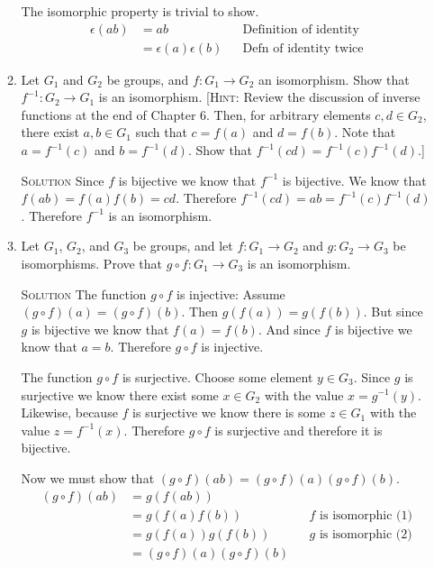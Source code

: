 \documentclass[twoside]{amsart}
\newcommand{\solution}{\textsc{Solution}\xspace}
\newcommand{\blank}{\vspace{5pt}}
\newcommand{\ind}{\hspace{.35in}}
\begin{document}
\begin{enumerate}[A.]
\begin{enumerate}[1]
	The isomorphic property is trivial to show. 
	\begin{align*}
	    \epsilon(ab) &= ab && \text{Definition of identity} \\
		              &= \epsilon(a)\epsilon(b) && \text{Defn of identity twice}
	\end{align*}

	\item Let $G_1$ and $G_2$ be groups, and $f: G_1 \to G_2$ an isomorphism.
	Show that $f^{-1} : G_2 \to G_1$ is an isomorphism. [\textsc{Hint}:
	Review the discussion of inverse functions at the end of Chapter 6. Then,
	for arbitrary elements $c, d \in G_2$, there exist $a, b \in G_1$ such
	that $c = f(a)$ and $d = f(b)$. Note that $a = f^{-1}(c)$ and 
	$b = f^{-1}(d)$. Show that $f^{-1}(cd)=f^{-1}(c)f^{-1}(d)$.]

   \blank \noindent \solution Since $f$ is bijective we know that
	$f^{-1}$ is bijective. We know that $f(ab)=f(a)f(b)=cd$. Therefore
	$f^{-1}(cd)=ab=f^{-1}(c)f^{-1}(d)$. Therefore $f^{-1}$ is an isomorphism.

	\item Let $G_1$, $G_2$, and $G_3$ be groups, and let $f: G_1 \to G_2$ and
	$g:G_2 \to G_3$ be isomorphisms. Prove that $g \circ f : G_1 \to G_3$ is
	an isomorphism.

	\blank \noindent \solution The function $g \circ f$ is injective:
	Assume $(g \circ f)(a) = (g \circ f)(b)$. Then $g(f(a)) = g(f(b))$. But
	since $g$ is bijective we know that $f(a)=f(b)$. And since $f$ is
	bijective we know that $a=b$. Therefore $g \circ f$ is injective.

	\ind The function $g \circ f$ is surjective. Choose some element $y \in G_3$.
	Since $g$ is surjective we know there exist some $x \in G_2$ with
	the value $x = g^{-1}(y)$. Likewise, because $f$ is surjective
	we know there is some $z \in G_1$ with the value $z = f^{-1}(x)$. 
	Therefore $g \circ f$ is surjective and therefore it is bijective.

	Now we must show that $(g \circ f)(ab) = (g\circ f)(a)(g\circ f)(b)$.
	\begin{align}
		(g \circ f)(ab) &= g(f(ab))   \\
		                &= g(f(a)f(b))  && \text{$f$ is isomorphic (1)} \\
							 &= g(f(a)) g(f(b)) && \text{$g$ is isomorphic (2)} \\
							 &= (g \circ f)(a) (g\circ f)(b)
	\end{align}


\end{enumerate}
\end{enumerate}
\end{document}
